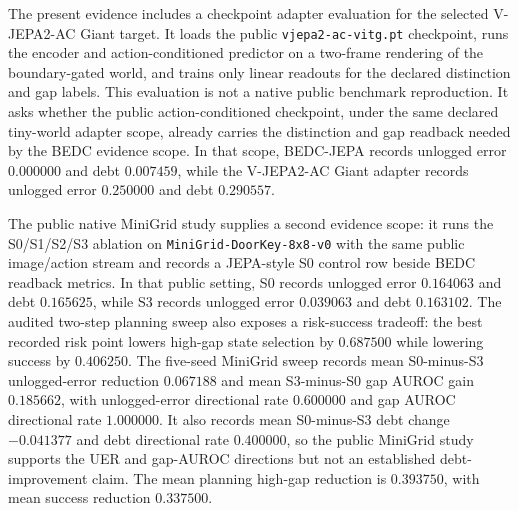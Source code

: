 The present evidence includes a checkpoint adapter evaluation for the selected
V-JEPA2-AC Giant target.  It loads the public
\texttt{vjepa2-ac-vitg.pt} checkpoint, runs the encoder and action-conditioned
predictor on a two-frame rendering of the boundary-gated world, and trains only
linear readouts for the declared distinction and gap labels.  This evaluation
is not a native public benchmark reproduction.  It asks whether the public
action-conditioned checkpoint, under the same declared tiny-world adapter
scope, already carries the distinction and gap readback needed by the BEDC
evidence scope.  In that scope, BEDC-JEPA records unlogged error
$0.000000$ and debt $0.007459$, while the V-JEPA2-AC Giant adapter records
unlogged error $0.250000$ and debt $0.290557$.

The public native MiniGrid study supplies a second evidence scope: it runs
the S0/S1/S2/S3 ablation on \texttt{MiniGrid-DoorKey-8x8-v0} with the same
public image/action stream and records a JEPA-style S0 control row beside
BEDC readback metrics.  In that public setting, S0 records unlogged error
$0.164063$ and debt $0.165625$, while S3 records unlogged error $0.039063$
and debt $0.163102$.  The audited two-step planning sweep also exposes a
risk-success tradeoff: the best recorded risk point lowers high-gap state
selection by $0.687500$ while lowering success by $0.406250$.  The five-seed
MiniGrid sweep records mean S0-minus-S3 unlogged-error reduction $0.067188$
and mean S3-minus-S0 gap AUROC gain $0.185662$, with unlogged-error directional
rate $0.600000$ and gap AUROC directional rate $1.000000$.  It also records mean
S0-minus-S3 debt change $-0.041377$ and debt directional rate $0.400000$, so the
public MiniGrid study supports the UER and gap-AUROC directions but not an
established debt-improvement claim.  The mean planning high-gap reduction is
$0.393750$, with mean success reduction $0.337500$.

